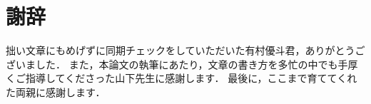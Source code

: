 \chapter*{謝辞}
拙い文章にもめげずに同期チェックをしていただいた有村優斗君，ありがとうございました．
また，本論文の執筆にあたり，文章の書き方を多忙の中でも手厚くご指導してくださった山下先生に感謝します．
最後に，ここまで育ててくれた両親に感謝します．

